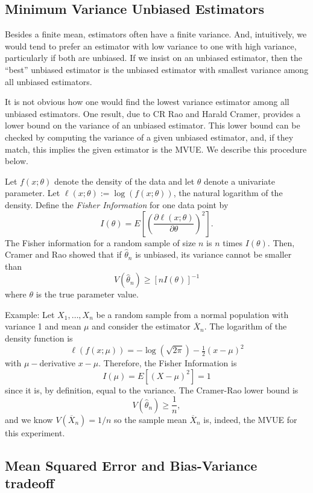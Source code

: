\documentclass[
]{book}
\begin{document}
\hypertarget{minimum-variance-unbiased-estimators}{%
\subsection{Minimum Variance Unbiased Estimators}\label{minimum-variance-unbiased-estimators}}

Besides a finite mean, estimators often have a finite variance. And, intuitively, we would tend to prefer an estimator with low variance to one with high variance, particularly if both are unbiased. If we insist on an unbiased estimator, then the ``best'' unbiased estimator is the unbiased estimator with smallest variance among all unbiased estimators.

It is not obvious how one would find the lowest variance estimator among all unbiased estimators. One result, due to CR Rao and Harald Cramer, provides a lower bound on the variance of an unbiased estimator. This lower bound can be checked by computing the variance of a given unbiased estimator, and, if they match, this implies the given estimator is the MVUE. We describe this procedure below.

Let \(f(x;\theta)\) denote the density of the data and let \(\theta\) denote a univariate parameter. Let \(\ell(x;\theta) := \log(f(x;\theta))\), the natural logarithm of the density. Define the \emph{Fisher Information} for one data point by
\[I(\theta) = E\left[\left(\frac{\partial \ell(x;\theta)}{\partial\theta}\right)^2\right].\]
The Fisher information for a random sample of size \(n\) is \(n\) times \(I(\theta)\). Then, Cramer and Rao showed that if \(\hat\theta_n\) is unbiased, its variance cannot be smaller than
\[V(\hat\theta_n)\geq \left[nI(\theta)\right]^{-1}\]
where \(\theta\) is the true parameter value.

Example: Let \(X_1, \ldots, X_n\) be a random sample from a normal population with variance 1 and mean \(\mu\) and consider the estimator \(\overline X_n\). The logarithm of the density function is
\[\ell(f(x;\mu)) = -\log(\sqrt{2\pi}) - \tfrac12(x - \mu)^2\]
with \(\mu-\)derivative \(x - \mu\). Therefore, the Fisher Information is
\[I(\mu) = E[(X - \mu)^2] = 1\]
since it is, by definition, equal to the variance. The Cramer-Rao lower bound is
\[V(\hat\theta_n)\geq \frac{1}{n},\]
and we know \(V(\overline X_n) = 1/n\) so the sample mean \(\overline X_n\) is, indeed, the MVUE for this experiment.

\hypertarget{mean-squared-error-and-bias-variance-tradeoff}{%
\subsection{Mean Squared Error and Bias-Variance tradeoff}\label{mean-squared-error-and-bias-variance-tradeoff}}
\end{document}
